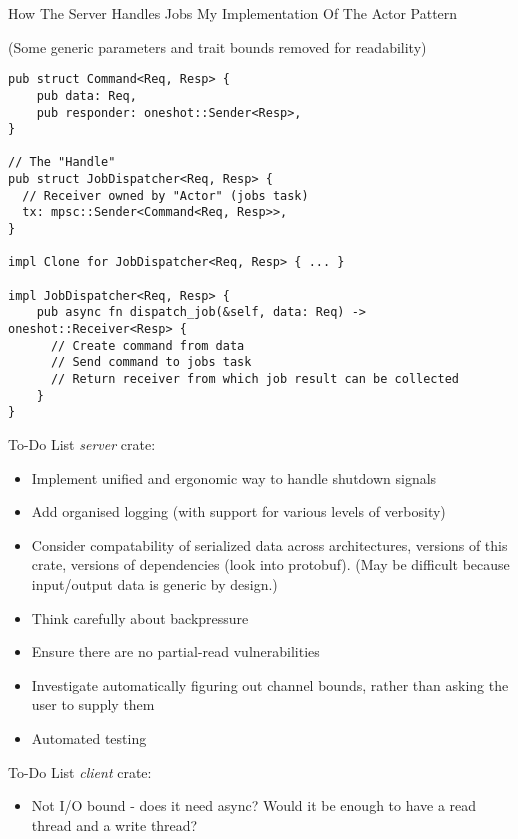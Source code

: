 \documentclass{beamer}
\begin{document}
\begin{frame}[fragile]{How The Server Handles Jobs}
  My Implementation Of The Actor Pattern \newline
  \begin{tiny}
    (Some generic parameters and trait bounds removed for readability)
  \end{tiny}
  \begin{mdframed}[backgroundcolor=light-gray, roundcorner=10pt,leftmargin=1, rightmargin=1, innerleftmargin=1, innerrightmargin=1, innertopmargin=1,innerbottommargin=1, outerlinewidth=1, linecolor=light-gray]
    \begin{lstlisting}[basicstyle=\tiny,]
pub struct Command<Req, Resp> {
    pub data: Req,
    pub responder: oneshot::Sender<Resp>,
}

// The "Handle"
pub struct JobDispatcher<Req, Resp> {
  // Receiver owned by "Actor" (jobs task)
  tx: mpsc::Sender<Command<Req, Resp>>,
}

impl Clone for JobDispatcher<Req, Resp> { ... }

impl JobDispatcher<Req, Resp> {
    pub async fn dispatch_job(&self, data: Req) -> oneshot::Receiver<Resp> {
      // Create command from data
      // Send command to jobs task
      // Return receiver from which job result can be collected
    }
}
    \end{lstlisting}
  \end{mdframed}
\end{frame}

\begin{frame}{To-Do List}
  \emph{server} crate:
  \begin{itemize}[<+->]
    \item<1> Implement unified and ergonomic way to handle shutdown signals
    \item<2> Add organised logging (with support for various levels of verbosity)
    \item<3> Consider compatability of serialized data across architectures, versions of this crate, versions
             of dependencies (look into protobuf). (May be difficult because input/output data is generic by design.)
    \item<4> Think carefully about backpressure
    \item<5> Ensure there are no partial-read vulnerabilities
    \item<6> Investigate automatically figuring out channel bounds, rather than asking the user to supply them
    \item<7> Automated testing
  \end{itemize}
\end{frame}

\begin{frame}{To-Do List}
  \emph{client} crate:
  \begin{itemize}[<+->]
    \item<1> Not I/O bound - does it need async? Would it be enough to have a read thread and a write thread?
  \end{itemize}
\end{frame}
\end{document}
